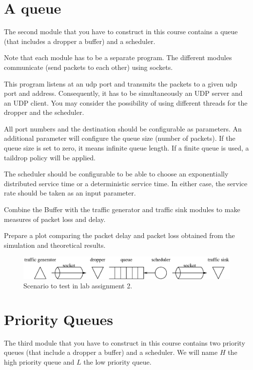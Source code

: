 \section{A queue}

The second module that you have to construct in this course contains a queue (that includes a dropper a buffer) and a scheduler.

Note that each module has to be a separate program. The different modules communicate (send packets to each other) using sockets.

This program listens at an udp port and transmits the packets to a given udp port and address. Consequently, it has to be simultaneously an UDP server and an UDP client. You may consider the possibility of using different threads for the dropper and the scheduler.

All port numbers and the destination should be configurable as parameters. An additional parameter will configure the queue size (number of packets). If the queue size is set to zero, it means infinite queue length. If a finite queue is used, a taildrop policy will be applied.

The scheduler should be configurable to be able to choose an exponentially distributed service time or a deterministic service time. In either case, the service rate should be taken as an input parameter.

Combine the Buffer with the traffic generator and traffic sink modules to make measures of packet loss and delay.

Prepare a plot comparing the packet delay and packet loss obtained from the simulation and theoretical results.

\begin{figure}[!h]
\centering
\includegraphics[width=\linewidth]{figures/scenario2.eps}
\caption{Scenario to test in lab assignment 2.}
\label{fig:scenario2}
\end{figure}

\section{Priority Queues}
The third module that you have to construct in this course contains two priority queues (that include a dropper a buffer) and a scheduler.
We will name $H$ the high priority queue and $L$ the low priority queue.

